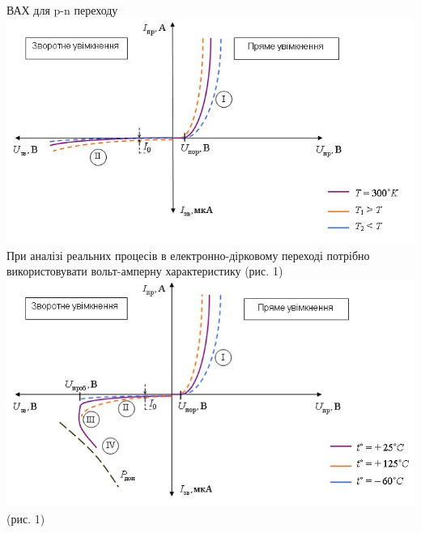\documentclass{beamer}
\begin{document}
\begin{frame}{ВАХ для p-n переходу}
\center \includegraphics[scale=0.23]{svax.jpg}\\
\tiny При аналізі реальних процесів в електронно-дірковому переході потрібно використовувати вольт-амперну характеристику (рис. 1)
\center \includegraphics[scale=0.25]{s1vax.jpg}\\
\tiny (рис. 1)
\end{frame}
\end{document}
